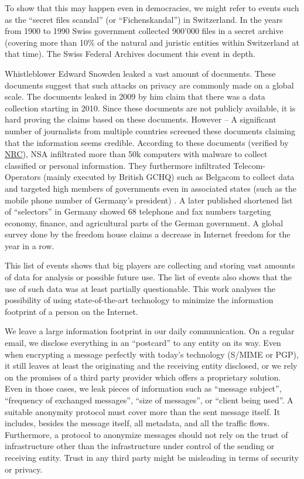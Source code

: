 To show that this may happen even in democracies, we might refer to events such as the ``secret files scandal'' (or  ``Fichenskandal'') in Switzerland. In the years from 1900 to 1990 Swiss government collected 900’000 files in a secret archive (covering more than 10\% of the natural and juristic entities within Switzerland at that time). The Swiss Federal Archives document this event in depth\cite{Leuenberger1989}.

Whistleblower Edward Snowden leaked a vast amount of documents. These documents suggest that such attacks on privacy are commonly made on a global scale. The documents leaked in 2009 by him claim that there was a data collection starting in 2010. Since these documents are not publicly available, it is hard proving the claims based on these documents. However -- A significant number of journalists from multiple countries screened these documents claiming that the information seems credible. According to these documents (verified by \href{http://www.nrc.nl/nieuws/2013/11/23/nederland-sinds-1946-doelwit-van-nsa}{NRC}), NSA infiltrated more than 50k computers with malware to collect classified or personal information. They furthermore infiltrated Telecom-Operators (mainly executed by British GCHQ) such as Belgacom to collect data and targeted high members of governments even in associated states (such as the mobile phone number of Germany's president) \cite{NCR2013,XKeyscore,Ball2013,Ackerman2013,Greenberg2013}. A later published shortened list of ``selectors'' in Germany showed 68 telephone and fax numbers targeting economy, finance, and agricultural parts of the German government. A global survey done by the freedom house\cite{FOTN2018} claims a decrease in Internet freedom for the  year in a row. 

This list of events shows that big players are collecting and storing vast amounts of data for analysis or possible future use. The list of events also shows that the use of such data was at least partially questionable. This work analyses the possibility of using state-of-the-art technology to minimize the information footprint of a person on the Internet. 

We leave a large information footprint in our daily communication. On a regular email, we disclose everything in an ``postcard'' to any entity on its way. Even when encrypting a message perfectly with today's technology (S/MIME\cite{RFC2045} or PGP\cite{RFC2015}), it still leaves at least the originating and the receiving entity disclosed, or we rely on the promises of a third party provider which offers a proprietary solution. Even in those cases, we leak pieces of information such as ``message subject'', ``frequency of exchanged messages'', ``size of messages'', or ``client being used''. A suitable anonymity protocol must cover more than the sent message itself. It includes, besides the message itself, all metadata, and all the traffic flows. Furthermore, a protocol to anonymize messages should not rely on the trust of infrastructure other than the infrastructure under control of the sending or receiving entity. Trust in any third party might be misleading in terms of security or privacy.

